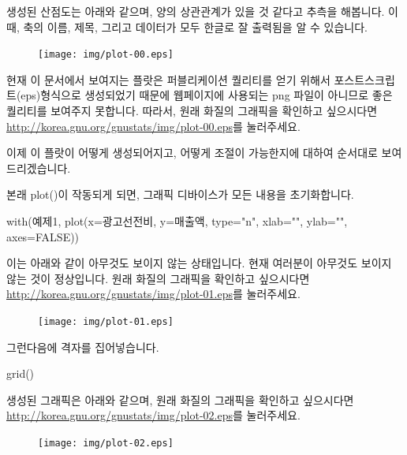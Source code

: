 생성된 산점도는 아래와 같으며, 양의 상관관계가 있을 것 같다고 추측을 해봅니다.
이때, 축의 이름, 제목, 그리고 데이터가 모두 한글로 잘 출력됨을 알 수 있습니다.

\begin{figure}
\begin{center}
\texttt{[image: img/plot-00.eps]}
\end{center}
\end{figure}

현재 이 문서에서 보여지는 플랏은 퍼블리케이션 퀄리티를 얻기 위해서 포스트스크립트(eps)형식으로 생성되었기 때문에 웹페이지에 사용되는 png 파일이 아니므로 좋은 퀄리티를 보여주지 못합니다. 
따라서, 원래 화질의 그래픽을 확인하고 싶으시다면 \href{http://korea.gnu.org/gnustats/img/plot-00.eps}{http://korea.gnu.org/gnustats/img/plot-00.eps}를 눌러주세요. 

이제 이 플랏이 어떻게 생성되어지고, 어떻게 조절이 가능한지에 대하여 순서대로 보여드리겠습니다.

본래 plot()이 작동되게 되면, 그래픽 디바이스가 모든 내용을 초기화합니다. 
\begin{Schunk}
\begin{Soutput}	
with(예제1, plot(x=광고선전비, y=매출액, type="n", xlab="", ylab="", axes=FALSE))
\end{Soutput}
\end{Schunk}

이는 아래와 같이 아무것도 보이지 않는 상태입니다. 
현재 여러분이 아무것도 보이지 않는 것이 정상입니다. 
원래 화질의 그래픽을 확인하고 싶으시다면 \href{http://korea.gnu.org/gnustats/img/plot-01.eps}{http://korea.gnu.org/gnustats/img/plot-01.eps}를 눌러주세요. 

\begin{figure}
\begin{center}
\texttt{[image: img/plot-01.eps]}
\end{center}
\end{figure}
 
 
그런다음에 격자를 집어넣습니다. 
\begin{Schunk}
\begin{Soutput}	
grid()
\end{Soutput}
\end{Schunk}
생성된 그래픽은 아래와 같으며, 원래 화질의 그래픽을 확인하고 싶으시다면 \href{http://korea.gnu.org/gnustats/img/plot-02.eps}{http://korea.gnu.org/gnustats/img/plot-02.eps}를 눌러주세요. 

\begin{figure}
\begin{center}
\texttt{[image: img/plot-02.eps]}
\end{center}
\end{figure}



